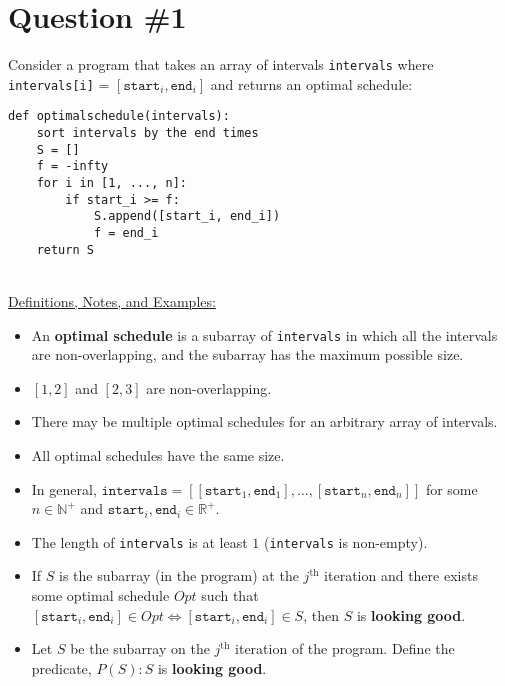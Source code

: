 \documentclass[12pt]{article}
\begin{document}
\renewcommand{\familydefault}{\rmdefault}



\pagebreak
\normalsize

\section*{Question \#1}
Consider a program that takes an array of intervals \texttt{intervals} where \texttt{intervals[i]} = \( [\texttt{start}_i, \texttt{end}_i] \) and returns an optimal schedule: \\
\begin{lstlisting}
def optimalschedule(intervals):
    sort intervals by the end times
    S = []
    f = -infty
    for i in [1, ..., n]:
        if start_i >= f:
            S.append([start_i, end_i])
            f = end_i
    return S
\end{lstlisting}
\leavevmode\\
\underline{Definitions, Notes, and Examples:}
\begin{itemize}
    \item An \textbf{optimal schedule} is a subarray of \texttt{intervals} in which all the intervals are non-overlapping, and the subarray has the maximum possible size.
    \item \( [1, 2] \) and \( [2, 3] \) are non-overlapping.
    \item There may be multiple optimal schedules for an arbitrary array of intervals.
    \item All optimal schedules have the same size.
    \item In general, \( \texttt{intervals} = [[\texttt{start}_1, \texttt{end}_1], \dots, [\texttt{start}_n, \texttt{end}_n]] \) for some \( n \in \mathbb{N}^+ \) and \( \texttt{start}_i, \texttt{end}_i \in \mathbb{R}^+ \).
    \item The length of \texttt{intervals} is at least $1$ (\texttt{intervals} is non-empty).
    \item If \( S \) is the subarray (in the program) at the \( j^{\text{th}} \) iteration and there exists some optimal schedule \( Opt \) such that \( [\texttt{start}_i, \texttt{end}_i] \in Opt \iff [\texttt{start}_i, \texttt{end}_i] \in S \), then \( S \) is \textbf{looking good}.
    \item Let \( S \) be the subarray on the \( j^{\text{th}} \) iteration of the program. Define the predicate, \( P(S): S \) is \textbf{looking good}.
\end{itemize}
\leavevmode\\
\end{document}
